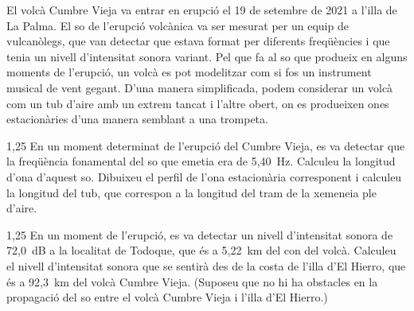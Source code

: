 El volcà Cumbre Vieja va entrar en erupció el 19 de setembre de 2021 a l'illa de La Palma. El so de l'erupció volcànica va ser mesurat per un equip de vulcanòlegs, que van detectar que estava format per diferents freqüències i que tenia un nivell d'intensitat sonora variant. Pel que fa al so que produeix en alguns moments de l'erupció, un volcà es pot modelitzar com si fos un instrument musical de vent gegant. D'una manera simplificada, podem considerar un volcà com un tub d'aire amb un extrem tancat i l'altre obert, on es produeixen ones estacionàries d'una manera semblant a una trompeta.

\begin{apartat}{1,25}
En un moment determinat de l'erupció del Cumbre Vieja, es va detectar que la freqüència fonamental del so que emetia era de 5,40~Hz. Calculeu la longitud d'ona d'aquest so. Dibuixeu el perfil de l'ona estacionària corresponent i calculeu la longitud del tub, que correspon a la longitud del tram de la xemeneia ple d'aire.
\end{apartat}

\begin{apartat}{1,25}
En un moment de l'erupció, es va detectar un nivell d'intensitat sonora de 72,0~dB a la localitat de Todoque, que és a 5,22~km del con del volcà. Calculeu el nivell d'intensitat sonora que se sentirà des de la costa de l'illa d'El Hierro, que és a 92,3~km del volcà Cumbre Vieja. (Suposeu que no hi ha obstacles en la propagació del so entre el volcà Cumbre Vieja i l'illa d'El Hierro.)
\end{apartat}

